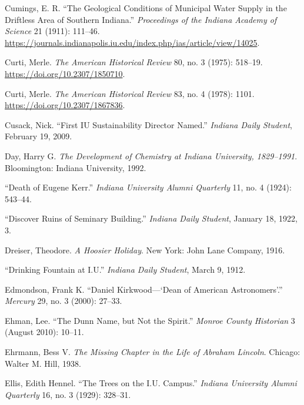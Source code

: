 \documentclass[
  american,
  letterpaper,
]{scrreprt}
\newlength{\cslhangindent}
\newenvironment{CSLReferences}[2] %
 {\begin{list}{}{%
  \setlength{\itemindent}{0pt}
  \setlength{\leftmargin}{0pt}
  \setlength{\parsep}{0pt}
  \ifodd #1
   \setlength{\leftmargin}{\cslhangindent}
   \setlength{\itemindent}{-1\cslhangindent}
  \fi
  \setlength{\itemsep}{#2\baselineskip}}}
 {\end{list}}
\begin{document}
\begin{CSLReferences}{1}{0}
Cumings, E. R. {``The Geological Conditions of Municipal Water Supply in
the Driftless Area of Southern Indiana.''} \emph{Proceedings of the
Indiana Academy of Science} 21 (1911): 111--46.
\url{https://journals.indianapolis.iu.edu/index.php/ias/article/view/14025}.

Curti, Merle. \emph{The American Historical Review} 80, no. 3 (1975):
518--19. \url{https://doi.org/10.2307/1850710}.

Curti, Merle. \emph{The American Historical Review} 83, no. 4 (1978):
1101. \url{https://doi.org/10.2307/1867836}.

Cusack, Nick. {``First IU Sustainability Director Named.''}
\emph{Indiana Daily Student}, February 19, 2009.

Day, Harry G. \emph{The Development of Chemistry at Indiana University,
1829--1991}. Bloomington: Indiana University, 1992.

{``Death of Eugene Kerr.''} \emph{Indiana University Alumni Quarterly}
11, no. 4 (1924): 543--44.

{``Discover Ruins of Seminary Building.''} \emph{Indiana Daily Student},
January 18, 1922, 3.

Dreiser, Theodore. \emph{A Hoosier Holiday}. New York: John Lane
Company, 1916.

{``Drinking Fountain at {I.U.}''} \emph{Indiana Daily Student}, March 9,
1912.

Edmondson, Frank K. {``Daniel Kirkwood---{`{Dean} of American
Astronomers'}.''} \emph{Mercury} 29, no. 3 (2000): 27--33.

Ehman, Lee. {``The Dunn Name, but Not the Spirit.''} \emph{Monroe County
Historian} 3 (August 2010): 10--11.

Ehrmann, Bess V. \emph{The Missing Chapter in the Life of Abraham
Lincoln}. Chicago: Walter M. Hill, 1938.

Ellis, Edith Hennel. {``{The Trees on the I.U. Campus}.''} \emph{Indiana
University Alumni Quarterly} 16, no. 3 (1929): 328--31.


\end{CSLReferences}
\end{document}
